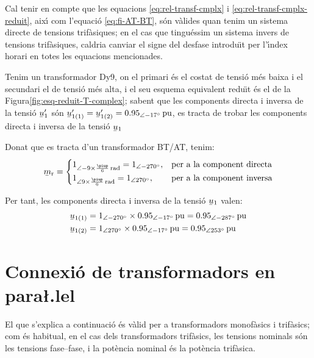 Cal tenir en compte que les equacions \eqref{eq:rel-transf-cmplx} i \eqref{eq:rel-transf-cmplx-reduit}, aix\'{\i} com l'equaci\'{o} \eqref{eq:fi-AT-BT}, s\'{o}n v\`{a}lides quan tenim un sistema directe de tensions trif\`{a}siques; en el cas que tingu\'{e}ssim un sistema invers de tensions trif\`{a}siques, caldria canviar el signe del desfase introdu\"{\i}t per l'\'{\i}ndex horari en totes les equacions mencionades.


\begin{exemple}
Tenim un transformador Dy9, on el primari \'{e}s el costat de tensi\'{o} m\'{e}s baixa  i el secundari el de tensi\'{o} m\'{e}s alta, i el seu esquema equivalent redu\"{\i}t \'{e}s el de la Figura\vref{fig:esq-reduit-T-complex}; sabent que les components directa i inversa de la tensi\'{o} $\cmplx{u}'_1$ s\'{o}n
$\cmplx{u}'_{1(1)}= \cmplx{u}'_{1(2)} = \SIpd{0,95}{-17}{pu}$, es tracta de trobar les components directa i inversa de la tensi\'{o} $\cmplx{u}_1$

    Donat que es tracta d'un transformador BT/AT, tenim:
    \[
    \cmplx{m}\ped{r} = \begin{cases}
      1_{\angle -9\times\frac{\piup}{6}\unit{rad}} = \numpd{1}{-270}, & \text{per a la component directa}\\
      1_{\angle 9\times\frac{\piup}{6}\unit{rad}} = \numpd{1}{ 270}, & \text{per a la component inversa}
    \end{cases}
    \]

     Per tant, les components directa i inversa de la tensi\'{o}  $\cmplx{u}_1$ valen:
    \begin{align*}
    \cmplx{u}_{1(1)} &= \numpd{1}{-270}\times \SIpd{0,95}{-17}{pu}  = \SIpd{0,95}{-287}{pu} \\
    \cmplx{u}_{1(2)} &= \numpd{1}{ 270}\times \SIpd{0,95}{-17}{pu}  = \SIpd{0,95}{253}{pu}
    \end{align*}
\end{exemple}



\section{\texorpdfstring{Connexi\'{o} de transformadors en para{\l.l}el}{Connexi\'{o} de transformadors en paral-lel}}

El que s'explica a continuaci\'{o} \'{e}s v\`{a}lid per a transformadors
monof\`{a}sics i trif\`{a}sics; com \'{e}s habitual, en el cas dels
transformadors trif\`{a}sics, les tensions nominals s\'{o}n les tensions
fase--fase, i la pot\`{e}ncia nominal \'{e}s la pot\`{e}ncia trif\`{a}sica.

